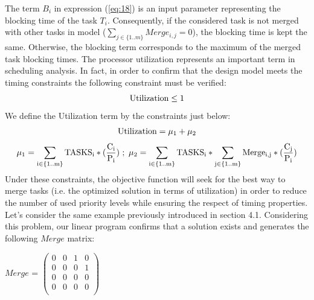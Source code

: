 \documentclass[runningheads,a4paper]{llncs}
\begin{document}
The term $B_i$ in expression (\ref{eq:18}) is an input parameter representing the blocking time of the task $T_i$. Consequently, if the considered task is not merged with other tasks in model ($\sum_{j \in \{1..m\}} Merge_{i,j} = 0$), the blocking time is kept the same. Otherwise, the blocking term corresponds to the maximum of the merged task blocking times. 
The processor utilization represents an important term in scheduling analysis. In fact, in order to confirm that the design model meets the timing constraints the following constraint must be verified: 
\begin{equation}
\footnotesize{\mathrm{Utilization \leq 1}}
\end{equation}
We define the Utilization term by the constraints just below:
\begin{equation}
\footnotesize{\mathrm{Utilization = \mu_1 + \mu_2}}
\end{equation}
\begin{equation}
\footnotesize{\mathrm{\mu_1 = \sum_{i \in \{1..m\}} TASKS_i * (\frac{C_i}{P_i})}} \ ; \ \footnotesize{\mathrm{\mu_2 = \sum_{i \in \{1..m\}} TASKS_i * \sum_{j \in \{1..m\}} Merge_{i,j}*(\frac{C_j}{P_i})}}
\end{equation}
Under these constraints, the objective function will seek for the best way to merge tasks (i.e. the optimized solution in terms of utilization) in order to reduce the number of used priority levels while ensuring the respect of timing properties. \\
Let's consider the same example previously introduced in section 4.1. Considering this problem, our linear program confirms that a solution exists and generates the following $Merge$ matrix: \\
\begin{center}
$Merge$ = $ \begin{pmatrix}
0&0&1&0\\
0&0&0&1 \\
0&0&0&0\\
0&0&0&0\\
\end{pmatrix}$
\end{center}
\end{document}
